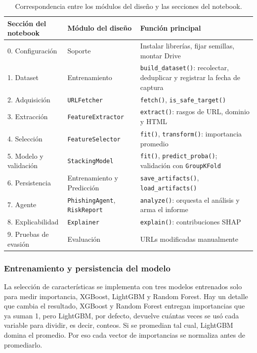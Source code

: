 \begin{table}[ht]
\caption{Correspondencia entre los módulos del diseño y las secciones del notebook.}
\label{tab:mapeo}
\centering
\footnotesize
\renewcommand{\arraystretch}{1.15}
\begin{tabular}{p{4.2cm} p{4.2cm} p{7.4cm}}
\hline
\textbf{Sección del notebook} & \textbf{Módulo del diseño} & \textbf{Función principal}\\
\hline
0. Configuración & Soporte & Instalar librerías, fijar semillas, montar Drive\\
1. Dataset & Entrenamiento & \texttt{build\_dataset()}: recolectar, deduplicar y registrar la fecha de captura\\
2. Adquisición & \texttt{URLFetcher} & \texttt{fetch()}, \texttt{is\_safe\_target()}\\
3. Extracción & \texttt{FeatureExtractor} & \texttt{extract()}: rasgos de URL, dominio y HTML\\
4. Selección & \texttt{FeatureSelector} & \texttt{fit()}, \texttt{transform()}: importancia promedio\\
5. Modelo y validación & \texttt{StackingModel} & \texttt{fit()}, \texttt{predict\_proba()}; validación con \texttt{GroupKFold}\\
6. Persistencia & Entrenamiento y Predicción & \texttt{save\_artifacts()}, \texttt{load\_artifacts()}\\
7. Agente & \texttt{PhishingAgent}, \texttt{RiskReport} & \texttt{analyze()}: orquesta el análisis y arma el informe\\
8. Explicabilidad & \texttt{Explainer} & \texttt{explain()}: contribuciones SHAP\\
9. Pruebas de evasión & Evaluación & URLs modificadas manualmente\\
\hline
\end{tabular}
\end{table}

\subsubsection{Entrenamiento y persistencia del modelo}

La selección de características se implementa con tres modelos entrenados solo para medir importancia, XGBoost, LightGBM y Random Forest. Hay un detalle que cambia el resultado, XGBoost y Random Forest entregan importancias que ya suman 1, pero LightGBM, por defecto, devuelve cuántas veces se usó cada variable para dividir, es decir, conteos. Si se promedian tal cual, LightGBM domina el promedio. Por eso cada vector de importancias se normaliza antes de promediarlo. \newline

